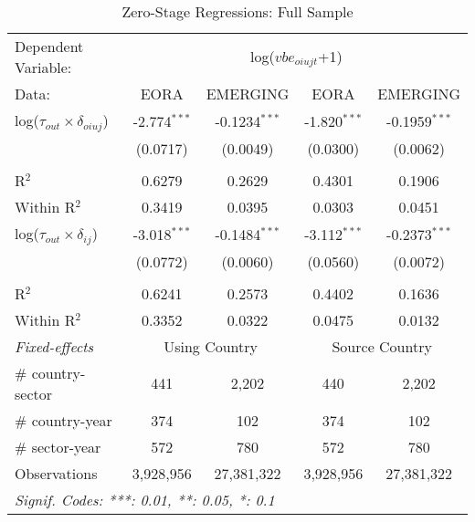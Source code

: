 \documentclass[a4paper]{article}
\begin{document}
\begin{table}[htbp]
   \caption{\label{tab:ZS_FULL} Zero-Stage Regressions: Full Sample}
   \centering
   \begin{tabular}{lcccc}
      \tabularnewline \midrule \midrule
      Dependent Variable: & \multicolumn{4}{c}{log($vbe_{oiujt}$+1)}\\
      Data:                               & EORA           & EMERGING        & EORA           & EMERGING \\   
      \midrule
      log($\tau_{out}\times \delta_{oiuj}$) & -2.774$^{***}$ & -0.1234$^{***}$ & -1.820$^{***}$ & -0.1959$^{***}$\\    
                                           & (0.0717)       & (0.0049)        & (0.0300)       & (0.0062)\\  \\   
      R$^2$                               & 0.6279         & 0.2629          & 0.4301         & 0.1906\\ 
      Within R$^2$                         & 0.3419         & 0.0395          & 0.0303         & 0.0451\\  
      \midrule
      log($\tau_{out}\times \delta_{ij}$)   & -3.018$^{***}$ & -0.1484$^{***}$ & -3.112$^{***}$ & -0.2373$^{***}$\\  
                                          & (0.0772)       & (0.0060)        & (0.0560)       & (0.0072)\\  \\
      R$^2$                               & 0.6241         & 0.2573          & 0.4402         & 0.1636\\  
      Within R$^2$                        & 0.3352         & 0.0322          & 0.0475         & 0.0132\\    
      \midrule
      \emph{Fixed-effects} & \multicolumn{2}{c}{Using Country} & \multicolumn{2}{c}{Source Country} \\
      \# country-sector      & 441            & 2,202             & 440            & 2,202\\  
      \# country-year               & 374            & 102             & 374            & 102\\   
      \# sector-year                & 572            & 780             & 572            & 780\\
     \midrule
      Observations                        & 3,928,956      & 27,381,322      & 3,928,956      & 27,381,322\\ 
      \midrule \midrule
      \multicolumn{5}{l}{\emph{Signif. Codes: ***: 0.01, **: 0.05, *: 0.1}}\\
   \end{tabular}
\end{table}
\FloatBarrier
\end{document}
